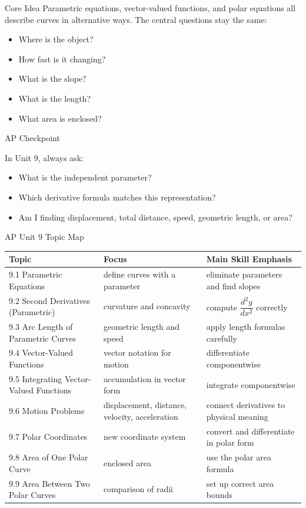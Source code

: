 \documentclass[11pt]{article}
\newcommand{\apcheckpoint}[1]{%
\begin{skillbox}{AP Checkpoint}
#1
\end{skillbox}
}
\begin{document}
\begin{theorybox}{Core Idea}
Parametric equations, vector-valued functions, and polar equations all describe curves in alternative ways.
The central questions stay the same:
\begin{itemize}
    \item Where is the object?
    \item How fast is it changing?
    \item What is the slope?
    \item What is the length?
    \item What area is enclosed?
\end{itemize}
\end{theorybox}

\apcheckpoint{
In Unit 9, always ask:
\begin{itemize}
    \item What is the independent parameter?
    \item Which derivative formula matches this representation?
    \item Am I finding displacement, total distance, speed, geometric length, or area?
\end{itemize}
}

\begin{theorybox}{AP Unit 9 Topic Map}
\renewcommand{\arraystretch}{1.25}
\begin{tabularx}{\textwidth}{@{}p{}p{}X@{}}
\toprule
Topic & Focus & Main Skill Emphasis \\
\midrule
9.1 Parametric Equations & define curves with a parameter & eliminate parameters and find slopes \\
9.2 Second Derivatives (Parametric) & curvature and concavity & compute \(\dfrac{d^2y}{dx^2}\) correctly \\
9.3 Arc Length of Parametric Curves & geometric length and speed & apply length formulas carefully \\
9.4 Vector-Valued Functions & vector notation for motion & differentiate componentwise \\
9.5 Integrating Vector-Valued Functions & accumulation in vector form & integrate componentwise \\
9.6 Motion Problems & displacement, distance, velocity, acceleration & connect derivatives to physical meaning \\
9.7 Polar Coordinates & new coordinate system & convert and differentiate in polar form \\
9.8 Area of One Polar Curve & enclosed area & use the polar area formula \\
9.9 Area Between Two Polar Curves & comparison of radii & set up correct area bounds \\
\bottomrule
\end{tabularx}
\end{theorybox}
\end{document}
